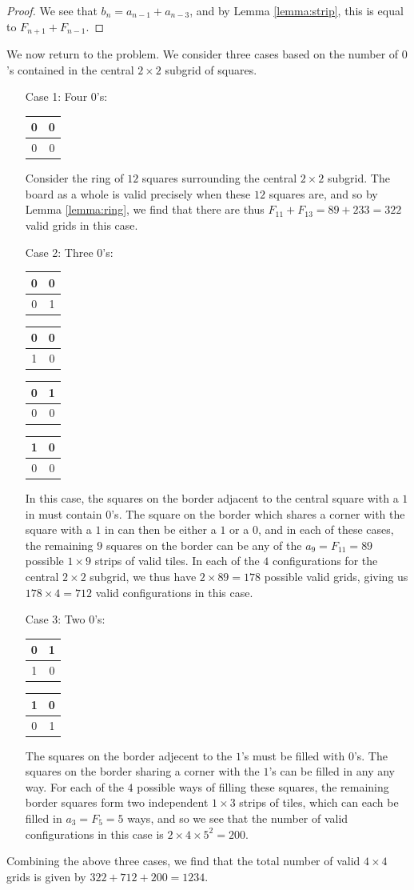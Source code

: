 \documentclass[a4paper,12pt]{article}
\newcommand{\grid}[4]{ %
	\begin{tabular}{|c|c|} %
		\hline %
		#1 & #2 \\
		\hline %
		#3 & #4 \\
		\hline %
	\end{tabular} %
}
\begin{document}
\begin{enumerate}
\begin{proof}
		We see that $b_n = a_{n-1} + a_{n-3}$, and by Lemma \ref{lemma:strip},
		this is equal to $F_{n+1} + F_{n-1}$.
	\end{proof}

We now return to the problem. We consider three cases based on the number
of $0$'s contained in the central $2 \times 2$ subgrid of squares.

\begin{enumerate}

	\item[Case 1:] Four $0$'s: \grid{0}{0}{0}{0}
		
		Consider the ring of $12$ squares surrounding the central $2 \times
		2$ subgrid. The board as a whole is valid precisely when these $12$
		squares are, and so by Lemma \ref{lemma:ring}, we find that there
		are thus $F_{11} + F_{13} = 89 + 233 = 322$ valid grids in this case.

	\item[Case 2:] Three $0$'s: \grid{0}{0}{0}{1} \grid{0}{0}{1}{0}
		\grid{0}{1}{0}{0} \grid{1}{0}{0}{0}

		In this case, the squares on the border adjacent to the central square
		with a $1$ in must contain $0$'s. The square on the border which shares
		a corner with the square with a $1$ in can then be either a $1$ or a
		$0$, and in each of these cases, the remaining $9$ squares on the
		border can be any of the $a_9 = F_{11} = 89$ possible $1 \times 9$
		strips of valid tiles. In each of the $4$ configurations for the central
		$2 \times 2$ subgrid, we thus have $2 \times 89 = 178$ possible valid
		grids, giving us $178 \times 4 = 712$ valid configurations in this
		case.

	\item[Case 3:] Two $0$'s: \grid{0}{1}{1}{0} \grid{1}{0}{0}{1}

		The squares on the border adjecent to the $1$'s must be filled with
		$0$'s. The squares on the border sharing a corner with the $1$'s can be
		filled in any any way. For each of the $4$ possible ways of filling
		these squares, the remaining border squares form two independent $1
		\times 3$ strips of tiles, which can each be filled in $a_3 = F_5 =
		5$ ways, and so we see that the number of valid
		configurations in this case is $2 \times 4 \times 5^2 = 200$.

\end{enumerate}

Combining the above three cases, we find that the total number of valid $4
\times 4$ grids is given by $322 + 712 + 200 = 1234$.


\end{enumerate}
\end{document}
